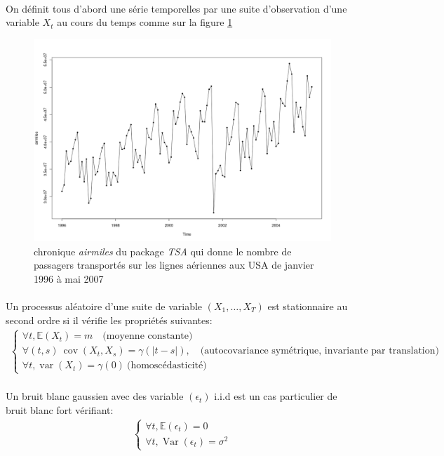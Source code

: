 \documentclass{article}
\theoremstyle{definition}
\theoremstyle{remark}
\begin{document}
\paragraph{}
On définit tous d'abord une série temporelles par une suite d'observation d'une variable $X_t$ au cours du temps comme sur 
la figure \ref{airmiles}
\begin{figure}[h]
	\label{airmiles}
	\centering
	\includegraphics[width=0.5\paperwidth]{logos/airmiles.png}
	\caption{chronique \textit{airmiles} du package \textit{TSA} qui donne le nombre de passagers transportés sur les lignes
	 aériennes aux USA de janvier 1996 à mai 2007}
\end{figure}
\paragraph{}
Un processus aléatoire d'une suite de variable $(X_1, \ldots, X_T)$ est stationnaire au second ordre si il vérifie
les propriétés suivantes:
\[
	\begin{aligned}
		\left\{
			\begin{array}{l}
				{\forall t, \mathbb{E}\left(X_{t}\right)=m \quad \text{(moyenne constante)}}  \\ 
				{\forall (t, s) \ \operatorname{cov}\left(X_{t}, X_{s}\right)=\gamma(|t-s|), \quad \text{(autocovariance symétrique, invariante par translation)}}  \\ 
				{\forall t, \operatorname{var}\left(X_{t}\right)=\gamma(0) \  \text{(homoscédasticité)}} 
			\end{array}
			\right.
\end{aligned}
\]
\paragraph{}
Un bruit blanc gaussien avec des variable $(\epsilon_t)$ i.i.d est un cas particulier de bruit blanc fort vérifiant:
\[
	\begin{aligned}
		\left\{
			\begin{array}{l}
				{\forall t, \mathbb{E}\left(\epsilon_{t}\right)=0}  \\ 

				{\forall t, \operatorname{Var}\left(\epsilon_{t}\right)=\sigma^2} 
			\end{array}
			\right.
\end{aligned}
\]
\end{document}
